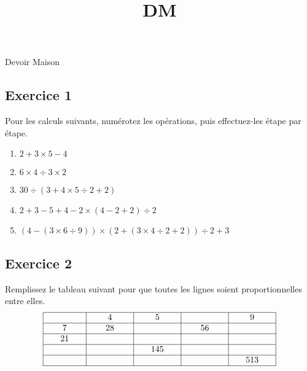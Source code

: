 \documentclass[14 pt]{extarticle}
\title{DM}
\date{}
\theoremstyle{plain}
\begin{document}
\begin{center}{\Large Devoir Maison}\\ 
 \end{center}
 \subsection*{Exercice 1 }
 
Pour les calculs suivants, numérotez les opérations, puis effectuez-les étape par étape. \begin{enumerate}
\item $2+3\times 5 - 4$
\item $6\times 4 \div 3 \times 2$
\item $30 \div (3 + 4\times 5 \div 2+2)$
\item $2 + 3 - 5 + 4 - 2 \times (4 - 2 + 2) \div 2$
\item $(4 - (3\times 6 \div 9)) \times (2 + (3\times 4 \div 2+2))\div 2 + 3$
\end{enumerate}
 
 \subsection*{Exercice 2 }
 
 Remplissez le tableau suivant pour que toutes les lignes soient proportionnelles entre elles. 
\[
\begin{array}{|c|c|c|c|c|}
\hline
\phantom{000}     \phantom{1}   \phantom{000} 
& \phantom{000}   4   \phantom{000} & 
\phantom{000}     5   \phantom{000} & 
\phantom{000}    \phantom{ 8}   \phantom{000} & 
\phantom{000}     9  \phantom{000}
\\\hline
\phantom{000}     7    \phantom{000} 
& \phantom{000}   28   \phantom{000} & 
\phantom{000}    \phantom{ 35}   \phantom{000} & 
\phantom{000}     56   \phantom{000} & 
\phantom{000}     \phantom{63}   \phantom{000}
\\\hline
\phantom{000}     21   \phantom{000} 
& \phantom{000}  \phantom{ 84}   \phantom{000} & 
\phantom{000}    \phantom{ 105}     \phantom{000} & 
\phantom{000}     \phantom{168}   \phantom{000} & 
\phantom{000}     \phantom{189}   \phantom{000}
\\\hline
\phantom{000}     \phantom{29}   \phantom{000} 
& \phantom{000}  \phantom{ 116}   \phantom{000} & 
\phantom{000}     145   \phantom{000} & 
\phantom{000}    \phantom{ 232}   \phantom{000} & 
\phantom{000}     \phantom{261}   \phantom{000}
\\\hline
\phantom{000}    \phantom{ 57 }  \phantom{000} 
& \phantom{000}   \phantom{228 }  \phantom{000} & 
\phantom{000}    \phantom{ 285   }\phantom{000} & 
\phantom{000}     \phantom{456 }  \phantom{000} & 
\phantom{000}     513   \phantom{000}
\\
\hline
\end{array}\]
 
\end{document}
